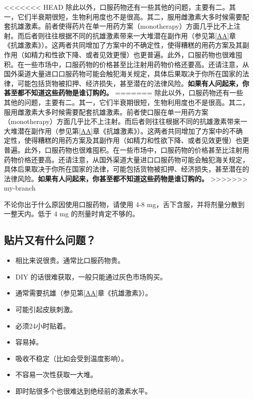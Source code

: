 \documentclass{article}
\begin{document}
<<<<<<< HEAD
除此以外，口服药物还有一些其他的问题，主要有二。其一，它们半衰期很短，生物利用度也不是很高。其二，服用雌激素大多时候需要配套抗雄激素。前者使得药片在单一用药方案（monotherapy）方面几乎比不上注射。而后者则往往根据不同的抗雄激素带来一大堆潜在副作用（参见第\ref{AA}章《抗雄激素》）。这两者共同增加了方案中的不确定性，使得糟糕的用药方案及其副作用（如精力和性欲下降、或者见效更慢）也更普遍。此外，口服药物也很难囤积。在一些市场中，口服药物的价格甚至比注射用药物价格还要高。还请注意，从国外渠道大量进口口服药物可能会触犯海关规定，具体后果取决于你所在国家的法律，可能包括货物被扣押、经济损失，甚至潜在的法律风险。\textbf{如果有人问起来，你甚至都不知道这些药物是谁订购的。}
=======
除此以外，口服药物还有一些其他的问题，主要有二。其一，它们半衰期很短，生物利用度也不是很高。其二，服用雌激素大多时候需要配套抗雄激素。前者使口服在单一用药方案（monotherapy）方面几乎比不上注射。而后者则往往根据不同的抗雄激素带来一大堆潜在副作用（参见第\ref{AA}章《抗雄激素》）。这两者共同增加了方案中的不确定性，使得糟糕的用药方案及其副作用（如精力和性欲下降、或者见效更慢）也更普遍。此外，口服药物也很难囤积。在一些市场中，口服药物的价格甚至比注射用药物价格还要高。还请注意，从国外渠道大量进口口服药物可能会触犯海关规定，具体后果取决于你所在国家的法律，可能包括货物被扣押、经济损失，甚至潜在的法律风险。\textbf{如果有人问起来，你甚至都不知道这些药物是谁订购的。}
>>>>>>> my-branch

不论你出于什么原因使用口服药物，请使用 4-8 mg，舌下含服，并将剂量分散到一整天内。低于 4 mg 的剂量时肯定不够的。

\subsection{贴片又有什么问题？}

\begin{itemize}
  \item 相比来说很贵。通常比口服药物贵。
  \item DIY 的话很难获取，一般只能通过灰色市场购买。
  \item 通常需要抗雄（参见第\ref{AA}章《抗雄激素》）。
  \item 可能引起皮肤刺激。
  \item 必须24小时贴着。
  \item 容易掉。
  \item 吸收不稳定（比如会受到温度影响）。
  \item 不容易一次性获取一大堆。
  \item 即时贴很多个也很难达到绝经前的激素水平。
\end{itemize}
\end{document}
